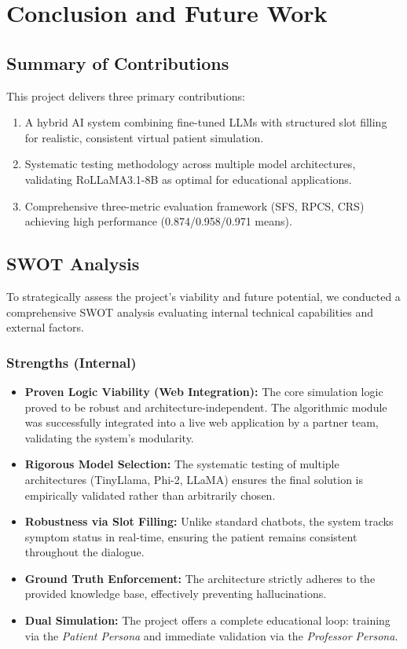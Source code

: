 \documentclass[runningheads,a4paper,11pt]{report}
\begin{document}
\chapter{Conclusion and Future Work}
\label{chapter:concl}

\section{Summary of Contributions}

This project delivers three primary contributions:

\begin{enumerate}
\item A hybrid AI system combining fine-tuned LLMs with structured slot filling for realistic, consistent virtual patient simulation.
\item Systematic testing methodology across multiple model architectures, validating RoLLaMA3.1-8B as optimal for educational applications.
\item Comprehensive three-metric evaluation framework (SFS, RPCS, CRS) achieving high performance (0.874/0.958/0.971 means).
\end{enumerate}

\section{SWOT Analysis}
\label{section:swot}

To strategically assess the project's viability and future potential, we conducted a comprehensive SWOT analysis evaluating internal technical capabilities and external factors.

\subsection{Strengths (Internal)}
\begin{itemize}
    \item \textbf{Proven Logic Viability (Web Integration):} The core simulation logic proved to be robust and architecture-independent. The algorithmic module was successfully integrated into a live web application by a partner team, validating the system's modularity.
    \item \textbf{Rigorous Model Selection:} The systematic testing of multiple architectures (TinyLlama, Phi-2, LLaMA) ensures the final solution is empirically validated rather than arbitrarily chosen.
    \item \textbf{Robustness via Slot Filling:} Unlike standard chatbots, the system tracks symptom status in real-time, ensuring the patient remains consistent throughout the dialogue.
    \item \textbf{Ground Truth Enforcement:} The architecture strictly adheres to the provided knowledge base, effectively preventing hallucinations.
    \item \textbf{Dual Simulation:} The project offers a complete educational loop: training via the \textit{Patient Persona} and immediate validation via the \textit{Professor Persona}.
\end{itemize}
\end{document}
